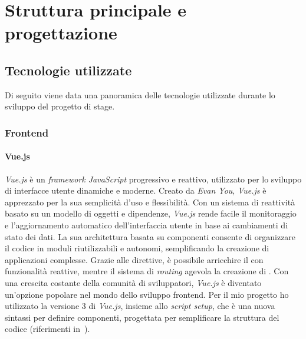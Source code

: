 \chapter{Struttura principale e progettazione}\label{cap:struttura-progettazione}


\section{Tecnologie utilizzate}\label{sec:tecnologie-utilizzate}
Di seguito viene data una panoramica delle tecnologie utilizzate durante lo sviluppo del progetto di stage.

\subsection{Frontend}\label{subsec:frontend}
\subsubsection{Vue.js}\label{subsubsec:vue-js}
\textit{Vue.js} è un \textit{framework JavaScript} progressivo e reattivo, utilizzato per lo sviluppo di interfacce utente dinamiche e moderne. 
Creato da \textit{Evan You}, \textit{Vue.js} è apprezzato per la sua semplicità d'uso e flessibilità. Con un sistema di reattività basato su un modello di oggetti e dipendenze, 
\textit{Vue.js} rende facile il monitoraggio e l'aggiornamento automatico dell'interfaccia utente in base ai cambiamenti di stato dei dati. La sua architettura basata 
su componenti consente di organizzare il codice in moduli riutilizzabili e autonomi, semplificando la creazione di applicazioni complesse. 
Grazie alle direttive, è possibile arricchire il  con funzionalità reattive, mentre il sistema di \textit{routing} agevola la creazione di . 
Con una crescita costante della comunità di sviluppatori, \textit{Vue.js} è diventato un'opzione popolare nel mondo dello sviluppo frontend.
Per il mio progetto ho utilizzato la versione 3 di \textit{Vue.js}, insieme allo \textit{script setup}, che è una nuova sintassi per definire componenti, progettata per semplificare la struttura del codice (riferimenti in~\cite{site:vue.js}).

